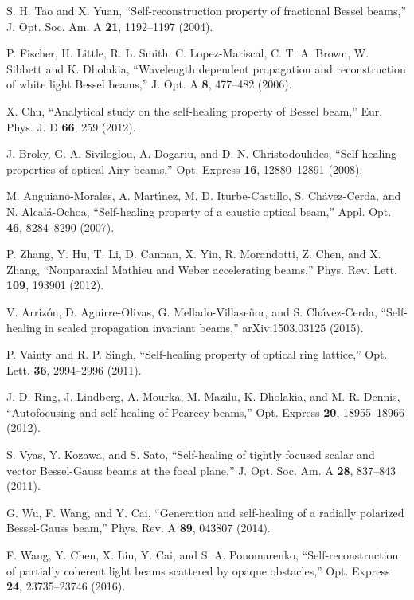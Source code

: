 \documentclass[10pt]{article}
\begin{document}
\begin{thebibliography}{99}
 S. H. Tao and X. Yuan, 
``Self-reconstruction  property of fractional Bessel beams,'' 
J. Opt. Soc. Am. A  \textbf{21}, 1192--1197 (2004).

P. Fischer, H. Little, R. L. Smith, C. Lopez-Mariscal, C. T. A. Brown,
W. Sibbett and K. Dholakia, 
``Wavelength dependent propagation and reconstruction of white light
Bessel beams,'' 
J. Opt. A \textbf{8}, 477--482 (2006).

X. Chu, 
``Analytical study on the self-healing property of Bessel beam,'' 
Eur. Phys. J. D \textbf{66}, 259 (2012).

J. Broky, G. A. Siviloglou, A. Dogariu, and  D. N. Christodoulides,  
``Self-healing properties of optical Airy  beams,''
 Opt. Express \textbf{16}, 12880--12891 (2008).

 M. Anguiano-Morales, A. Mart\'{\i}nez,  M. D. Iturbe-Castillo,
 S. Ch\'avez-Cerda, and N. Alcal\'a-Ochoa, 
  ``Self-healing property of a caustic optical beam,''
  Appl. Opt. \textbf{46}, 8284--8290 (2007).

P. Zhang, Y. Hu, T. Li, D. Cannan, X. Yin, R. Morandotti, Z. Chen, and
X. Zhang,  
``Nonparaxial Mathieu and Weber accelerating beams,'' 
Phys. Rev. Lett. \textbf{109}, 193901 (2012).

V. Arriz\'on, D. Aguirre-Olivas, G. Mellado-Villase\~{n}or, and S. Ch\'avez-Cerda,
``Self-healing in scaled propagation invariant beams,''
arXiv:1503.03125 (2015).

P. Vainty and R. P. Singh, 
``Self-healing property of optical ring lattice,'' 
Opt. Lett. \textbf{36}, 2994--2996  (2011).

J. D. Ring, J. Lindberg, A. Mourka, M. Mazilu, K. Dholakia, and
M. R. Dennis,
 ``Autofocusing and self-healing of Pearcey beams,'' 
Opt. Express \textbf{20}, 18955--18966 (2012).

S. Vyas, Y. Kozawa, and S. Sato, 
``Self-healing  of tightly focused scalar and vector Bessel-Gauss
beams at the focal   plane,'' 
J. Opt. Soc. Am. A \textbf{28}, 837--843 (2011). 

G. Wu, F. Wang, and Y. Cai, 
``Generation and self-healing of a radially polarized Bessel-Gauss
beam,''
Phys. Rev. A \textbf{89}, 043807 (2014).

F. Wang,  Y. Chen, X. Liu, Y. Cai, and S. A. Ponomarenko,
``Self-reconstruction of partially coherent light beams scattered by
opaque obstacles,''  
Opt. Express \textbf{24}, 23735--23746 (2016).


\end{thebibliography}
\end{document}
